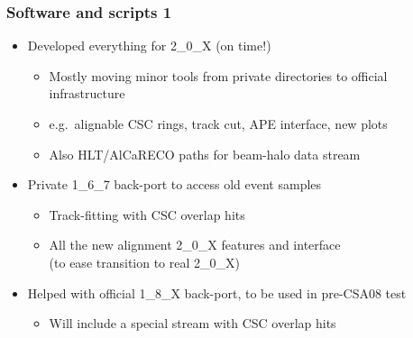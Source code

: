 \documentclass[compress]{beamer}
\begin{document}
\begin{frame}
\frametitle{Software and scripts 1}

\small
\begin{itemize}\setlength{\itemsep}{0.3 cm}
\item Developed everything for 2\_0\_X (on time!)
\begin{itemize}\setlength{\itemsep}{0.1 cm}
\item Mostly moving minor tools from private directories to official infrastructure
\item e.g.\ alignable CSC rings, track cut, APE interface, new plots
\item Also HLT/AlCaRECO paths for beam-halo data stream
\end{itemize}

\item Private 1\_6\_7 back-port to access old event samples
\begin{itemize}\setlength{\itemsep}{0.1 cm}
\item Track-fitting with CSC overlap hits
\item All the new alignment 2\_0\_X features and interface \\ (to ease transition to real 2\_0\_X)
\end{itemize}

\item Helped with official 1\_8\_X back-port, to be used in pre-CSA08 test
\begin{itemize}\setlength{\itemsep}{0.1 cm}
\item Will include a special stream with CSC overlap hits
\end{itemize}
\end{itemize}
\end{frame}
\end{document}
